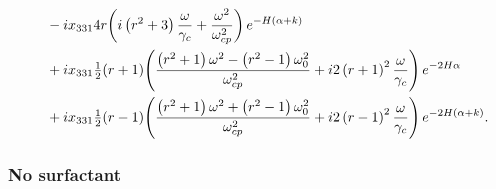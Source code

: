 \documentclass[reqno]{amsart}
\numberwithin{equation}{section}
\numberwithin{figure}{section}
\begin{document}
\begin{align*}
  &\phantom{=}\,\,-ix_{331}4r\!\left(i\left(r^{2}+3\right)\frac{\omega}{\gamma_{c}}+\frac{\omega^{2}}{\omega_{cp}^{2}}\right)e^{-H\left(\alpha+k\right)} \\
  &\phantom{=}\,\,+ix_{331}\tfrac{1}{2}\!\left(r+1\right)\!\left(\frac{\left(r^{2}+1\right)\omega^{2}-\left(r^{2}-1\right)\omega_{0}^{2}}{\omega_{cp}^{2}}+i2\left(r+1\right)^{2}\frac{\omega}{\gamma_{c}}\right)e^{-2H\alpha} \\
  &\phantom{=}\,\,+ix_{331}\tfrac{1}{2}\!\left(r-1\right)\!\left(\frac{\left(r^{2}+1\right)\omega^{2}+\left(r^{2}-1\right)\omega_{0}^{2}}{\omega_{cp}^{2}}+i2\left(r-1\right)^{2}\frac{\omega}{\gamma_{c}}\right)e^{-2H\left(\alpha+k\right)}.
\end{align*}

\subsubsection{No surfactant}
\end{document}
